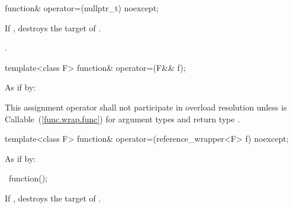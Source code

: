 %
%
\begin{itemdecl}
function& operator=(nullptr_t) noexcept;
\end{itemdecl}

\begin{itemdescr}
\pnum\effects If , destroys the target of .

\pnum\postcondition {}.

\pnum\returns {}
\end{itemdescr}

%
%
\begin{itemdecl}
template<class F> function& operator=(F&& f);
\end{itemdecl}

\begin{itemdescr}
\pnum\effects As if by: 

\pnum\returns {}

\pnum\remarks This assignment operator shall not participate in overload
resolution unless  is
Callable~(\ref{func.wrap.func}) for argument types  and
return type .
\end{itemdescr}

%
%
\begin{itemdecl}
template<class F> function& operator=(reference_wrapper<F> f) noexcept;
\end{itemdecl}

\begin{itemdescr}
\pnum\effects As if by: 

\pnum
\returns {}
\end{itemdescr}

%
\begin{itemdecl}
~function();
\end{itemdecl}

\begin{itemdescr}
\pnum\effects If , destroys the target of .
\end{itemdescr}

